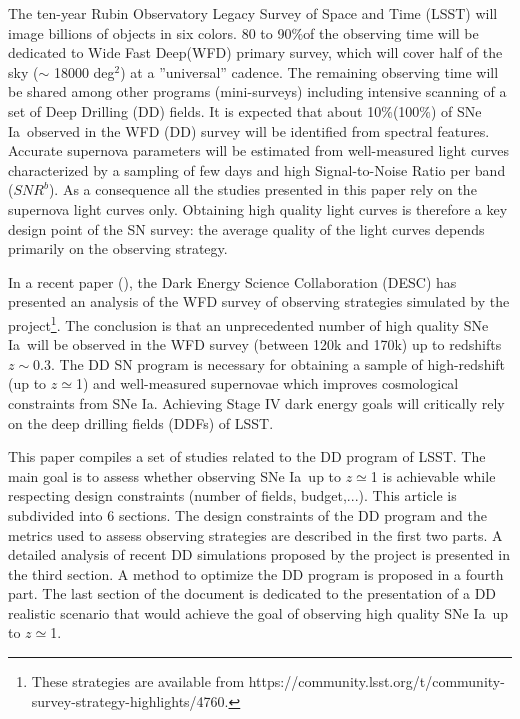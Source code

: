 \documentclass[\docopts]{\docclass}
\newcommand{\snrb}{\mbox{$SNR^b$}}
\newcommand{\sne}{{SNe Ia}}
\newcommand{\degsq}{{deg$^2$}}
\newcommand{\per}{$\%$}
\begin{document}
 The ten-year Rubin Observatory Legacy Survey of Space and Time (LSST) will image billions of objects in six colors. 80 to 90\per of the observing time will be dedicated to Wide Fast Deep(WFD) primary survey, which will cover half of the sky ($\sim$ 18000 \degsq) at a ''universal'' cadence. The remaining observing time will be shared among other programs (mini-surveys) including intensive scanning of a set of Deep Drilling (DD) fields. It is expected that about 10\per (100\per) of \sne~observed in the WFD (DD) survey will be identified from spectral features. Accurate supernova parameters will be estimated from well-measured light curves characterized by a sampling of few days and high Signal-to-Noise Ratio per band (\snrb).  As a consequence all the studies presented in this paper rely on the supernova light curves only.  Obtaining high quality light curves is therefore a key design point of the SN survey:  the average quality of the light curves depends primarily on the observing strategy.
\par
In a recent paper (\cite{lochner2021impact}), the Dark Energy Science Collaboration (DESC) has presented an analysis of the WFD survey of observing strategies simulated by the project\footnote{These strategies are available from https://community.lsst.org/t/community-survey-strategy-highlights/4760.}. The conclusion is that an unprecedented number of high quality \sne~will be observed in the WFD survey (between 120k and 170k) up to redshifts $z\sim 0.3$. The DD SN program is necessary for obtaining a sample of high-redshift (up to $z\simeq$1) and well-measured supernovae which improves cosmological constraints from \sne. Achieving Stage IV dark energy goals will critically rely on the deep drilling fields (DDFs) of LSST.
\par
This paper compiles a set of studies related to the DD program of LSST. The main goal is to assess whether observing \sne~up to $z\simeq$1 is achievable while respecting design constraints (number of fields, budget,...). This article is subdivided into 6 sections. The design constraints of the DD program and the metrics used to assess observing strategies are described in the first two parts. A detailed analysis of recent DD simulations proposed by the project is presented in the third section. A method to optimize the DD program is proposed in a fourth part. The last section of the document is dedicated to the presentation of a DD realistic scenario that would achieve the goal of observing high quality \sne~up to  $z\simeq$1.
\end{document}
